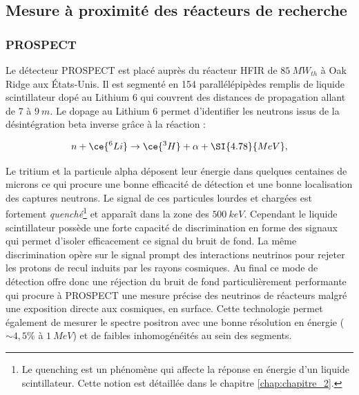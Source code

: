 \bigbreak

\subsection{Mesure à proximité des réacteurs de recherche}

\subsubsection*{PROSPECT}



Le détecteur PROSPECT est placé auprès du réacteur HFIR de $\SI{85}{MW_{th}}$ à Oak Ridge aux États-Unis. Il est segmenté en 154 parallélépipèdes remplis de liquide scintillateur dopé au Lithium 6 qui couvrent des distances de propagation allant de 7 à $\SI{9}{m}$. Le dopage au Lithium 6 permet d'identifier les neutrons issus de la désintégration beta inverse grâce à la réaction :

\begin{equation}
    n + \ce{^{6}Li} \rightarrow \ce{^{3}H} + \alpha + \SI{4.78}{MeV},
\end{equation}

\bigbreak

Le tritium et la particule alpha déposent leur énergie dans quelques centaines de microns ce qui procure une bonne efficacité de détection et une bonne localisation des captures neutrons. Le signal de ces particules lourdes et chargées est fortement \textit{quenché}\footnote{Le quenching est un phénomène qui affecte la réponse en énergie d'un liquide scintillateur. Cette notion est détaillée dans le chapitre \ref{chap:chapitre_2}.} et apparaît dans la zone des $\SI{500}{keV}$. Cependant le liquide scintillateur possède une forte capacité de discrimination en forme des signaux qui permet d'isoler efficacement ce signal du bruit de fond. La même discrimination opère sur le signal prompt des interactions neutrinos pour rejeter les protons de recul induits par les rayons cosmiques. Au final ce mode de détection offre donc une réjection du bruit de fond particulièrement performante qui procure à PROSPECT une mesure précise des neutrinos de réacteurs malgré une exposition directe aux cosmiques, en surface. Cette technologie permet également de mesurer le spectre positron avec une bonne résolution en énergie ($\sim 4,5\%$ à $\SI{1}{MeV}$) et de faibles inhomogénéités au sein des segments.\\

